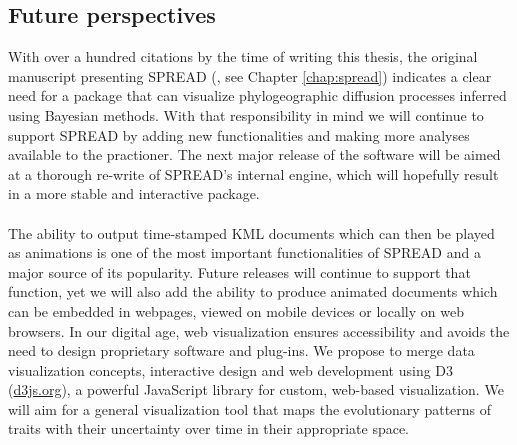 \subsection{Future perspectives}

With over a hundred citations by the time of writing this thesis, the original manuscript presenting SPREAD (\citet{Bielejec2011}, see Chapter \ref{chap:spread}) indicates a clear need for a package that can visualize phylogeographic diffusion processes inferred using Bayesian methods.
With that responsibility in mind we will continue to support SPREAD by adding new functionalities and making more analyses available to the practioner.
The next major release of the software will be aimed at a thorough re-write of SPREAD's internal engine, which will hopefully result in a more stable and interactive package.

\paragraph{}
The ability to output time-stamped KML documents which can then be played as animations is one of the most important functionalities of SPREAD and a major source of its popularity.
Future releases will continue to support that function, yet we will also add the ability to produce animated documents which can be embedded in webpages, viewed on mobile devices or locally on web browsers.
In our digital age, web visualization ensures accessibility and avoids the need to design proprietary software and plug-ins. We propose to merge data visualization concepts, interactive design and web development using D3 (\url{d3js.org}), a powerful JavaScript library for custom, web-based visualization. 
We will aim for a general visualization tool that maps the evolutionary patterns of traits with their uncertainty over time in their appropriate space. 


